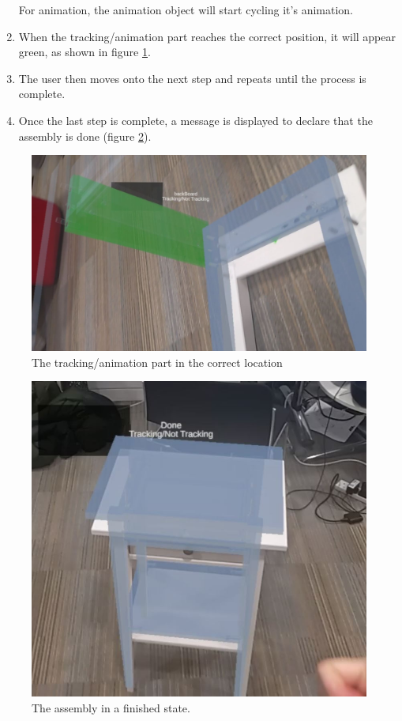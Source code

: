 \documentclass{l4proj}
\begin{document}
\begin{enumerate}
    For animation, the animation object will start cycling it's animation.
    \item When the tracking/animation part reaches the correct position, it will appear green, as shown in figure \ref{fig:correctPos}.

    \item The user then moves onto the next step and repeats until the process is complete.
    \item Once the last step is complete, a message is displayed to declare that the assembly is done (figure \ref{fig:complete}).
    
\end{enumerate}

\clearpage

\begin{figure}[hbt!]
    \centering
    \includegraphics[width=0.7\linewidth]{dissertation//images/correctPos.JPG}
    \caption{The tracking/animation part in the correct location}
    \label{fig:correctPos}
\end{figure}

\begin{figure}[hbt!]
    \centering
    \includegraphics[width=0.5\linewidth]{dissertation//images/complete.JPG}
    \caption{The assembly in a finished state.}
    \label{fig:complete}
\end{figure}
\end{document}
